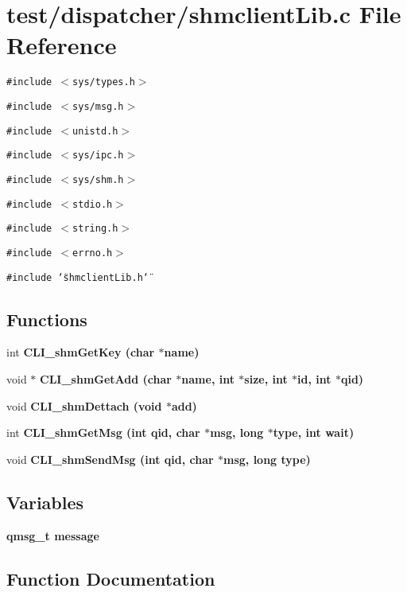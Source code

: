 \section{test/dispatcher/shmclient\-Lib.c File Reference}
\label{dispatcher_2shmclientLib_8c}
{\tt \#include $<$sys/types.h$>$}\par
{\tt \#include $<$sys/msg.h$>$}\par
{\tt \#include $<$unistd.h$>$}\par
{\tt \#include $<$sys/ipc.h$>$}\par
{\tt \#include $<$sys/shm.h$>$}\par
{\tt \#include $<$stdio.h$>$}\par
{\tt \#include $<$string.h$>$}\par
{\tt \#include $<$errno.h$>$}\par
{\tt \#include \char`\"{}shmclient\-Lib.h\char`\"{}}\par
\subsection*{Functions}
\begin{CompactItemize}
\item 
int \bf{CLI\_\-shm\-Get\-Key} (char $\ast$name)
\item 
void $\ast$ \bf{CLI\_\-shm\-Get\-Add} (char $\ast$name, int $\ast$size, int $\ast$id, int $\ast$qid)
\item 
void \bf{CLI\_\-shm\-Dettach} (void $\ast$add)
\item 
int \bf{CLI\_\-shm\-Get\-Msg} (int qid, char $\ast$msg, long $\ast$type, int wait)
\item 
void \bf{CLI\_\-shm\-Send\-Msg} (int qid, char $\ast$msg, long type)
\end{CompactItemize}
\subsection*{Variables}
\begin{CompactItemize}
\item 
\bf{qmsg\_\-t} \bf{message}
\end{CompactItemize}


\subsection{Function Documentation}
